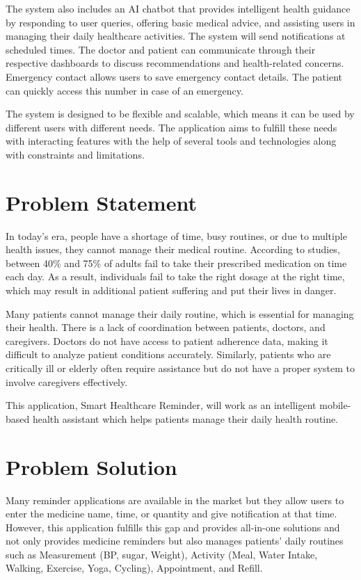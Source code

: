 The system also includes an AI chatbot that provides intelligent health guidance by responding to user queries, offering basic medical advice, and assisting users in managing their daily healthcare activities. The system will send notifications at scheduled times. The doctor and patient can communicate through their respective dashboards to discuss recommendations and health-related concerns. Emergency contact allows users to save emergency contact details. The patient can quickly access this number in case of an emergency.

The system is designed to be flexible and scalable, which means it can be used by different users with different needs. The application aims to fulfill these needs with interacting features with the help of several tools and technologies along with constraints and limitations.

\section{Problem Statement}
\label{sec:problem-statement}

In today's era, people have a shortage of time, busy routines, or due to multiple health issues, they cannot manage their medical routine. According to studies, between 40\% and 75\% of adults fail to take their prescribed medication on time each day. As a result, individuals fail to take the right dosage at the right time, which may result in additional patient suffering and put their lives in danger.

Many patients cannot manage their daily routine, which is essential for managing their health. There is a lack of coordination between patients, doctors, and caregivers. Doctors do not have access to patient adherence data, making it difficult to analyze patient conditions accurately. Similarly, patients who are critically ill or elderly often require assistance but do not have a proper system to involve caregivers effectively.

This application, Smart Healthcare Reminder, will work as an intelligent mobile-based health assistant which helps patients manage their daily health routine.

\section{Problem Solution}
\label{sec:problem-solution}

Many reminder applications are available in the market but they allow users to enter the medicine name, time, or quantity and give notification at that time. However, this application fulfills this gap and provides all-in-one solutions and not only provides medicine reminders but also manages patients' daily routines such as Measurement (BP, sugar, Weight), Activity (Meal, Water Intake, Walking, Exercise, Yoga, Cycling), Appointment, and Refill.

